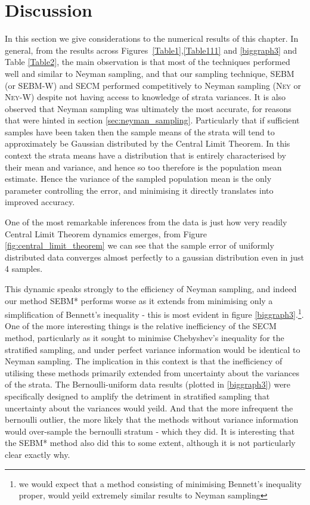 \section{Discussion}
\label{sec:discussion}

In this section we give considerations to the numerical results of this chapter.
In general, from the results across Figures~\ref{Table1},\ref{Table111} and \ref{biggraph3} and Table \ref{Table2}, the main observation is that most of the techniques performed well and similar to Neyman sampling, and that our sampling technique, SEBM (or SEBM-W) and SECM performed competitively to Neyman sampling (\textsc{Ney} or \textsc{Ney-W}) despite not having access to knowledge of strata variances.
It is also observed that Neyman sampling was ultimately the most accurate, for reasons that were hinted in section \ref{sec:neyman_sampling}.
Particularly that if sufficient samples have been taken then the sample means of the strata will tend to approximately be Gaussian distributed by the Central Limit Theorem.
In this context the strata means have a distribution that is entirely characterised by their mean and variance, and hence so too therefore is the population mean estimate.
Hence the variance of the sampled population mean is the only parameter controlling the error, and minimising it directly translates into improved accuracy.

One of the most remarkable inferences from the data is just how very readily Central Limit Theorem dynamics emerges, from Figure \ref{fig:central_limit_theorem} we can see that the sample error of uniformly distributed data converges almost perfectly to a gaussian distribution even in just 4 samples.



This dynamic speaks strongly to the efficiency of Neyman sampling, and indeed our method SEBM* performs worse as it extends from minimising only a simplification of Bennett's inequality - this is most evident in figure \ref{biggraph3}.\footnote{we would expect that a method consisting of minimising Bennett's inequality proper, would yeild extremely similar results to Neyman sampling}.
One of the more interesting things is the relative inefficiency of the SECM method, particularly as it sought to minimise Chebyshev's inequality for the stratified sampling, and under perfect variance information would be identical to Neyman sampling.
The implication in this context is that the inefficiency of utilising these methods primarily extended from uncertainty about the variances of the strata.
The Bernoulli-uniform data results (plotted in \ref{biggraph3}) were specifically designed to amplify the detriment in stratified sampling that uncertainty about the variances would yeild.
And that the more infrequent the bernoulli outlier, the more likely that the methods without variance information would over-sample the bernoulli stratum - which they did.
It is interesting that the SEBM* method also did this to some extent, although it is not particularly clear exactly why.


